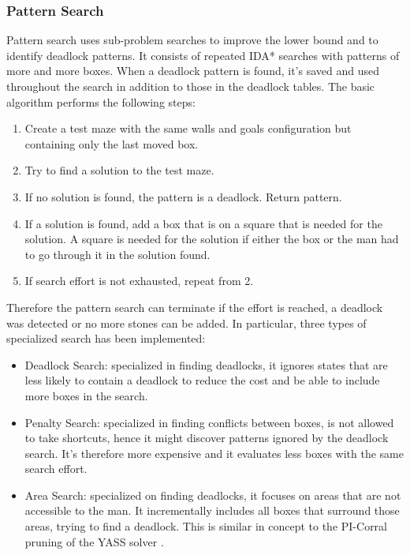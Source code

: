 \subsubsection*{Pattern Search}
Pattern search uses sub-problem searches to improve the lower bound and to identify deadlock patterns. It consists of repeated IDA* searches with patterns of more and more boxes. When a deadlock pattern is found, it's saved and used throughout the search in addition to those in the deadlock tables.
The basic algorithm performs the following steps:
\begin{enumerate}
    \item Create a test maze with the same walls and goals configuration but containing only the last moved box.
    \item Try to find a solution to the test maze.
    \item If no solution is found, the pattern is a deadlock. Return pattern.
    \item If a solution is found, add a box that is on a square that is needed for the solution. A square is needed for the solution if either the box or the man had to go through it in the solution found.
    \item If search effort is not exhausted, repeat from 2.
\end{enumerate}
Therefore the pattern search can terminate if the effort is reached, a deadlock was detected or no more stones can be added.
In particular, three types of specialized search has been implemented: 
\begin{itemize}
    \item Deadlock Search: specialized in finding deadlocks, it ignores states that are less likely to contain a deadlock to reduce the cost and be able to include more boxes in the search.
    \item Penalty Search: specialized in finding conflicts between boxes, is not allowed to take shortcuts, hence it might discover patterns ignored by the deadlock search. It's therefore more expensive and it evaluates less boxes with the same search effort.
    \item Area Search: specialized on finding deadlocks, it focuses on areas that are not accessible to the man. It incrementally includes all boxes that surround those areas, trying to find a deadlock. This is similar in concept to the PI-Corral pruning of the YASS solver \cite{yassscribbles}.
\end{itemize}

